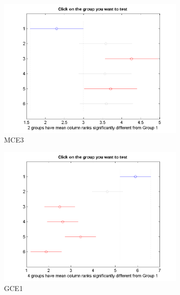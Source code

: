 \begin{figure}
\begin{subfigure}[b]{0.49\linewidth}
		\includegraphics[width=\linewidth]{Figures/D-Bonferroni_HNMED_VS_ED3}
		\caption{MCE3} \label{fig:Bon_M3} 
	\end{subfigure}
	\begin{subfigure}[b]{0.49\linewidth}
		\includegraphics[width=\linewidth]{Figures/D-Bonferroni_HNMED_VS_ED4}
		\caption{GCE1} \label{fig:Bon_G1} 
	\end{subfigure}
	\begin{subfigure}[b]{0.49\linewidth}

\end{subfigure}
\end{figure}
